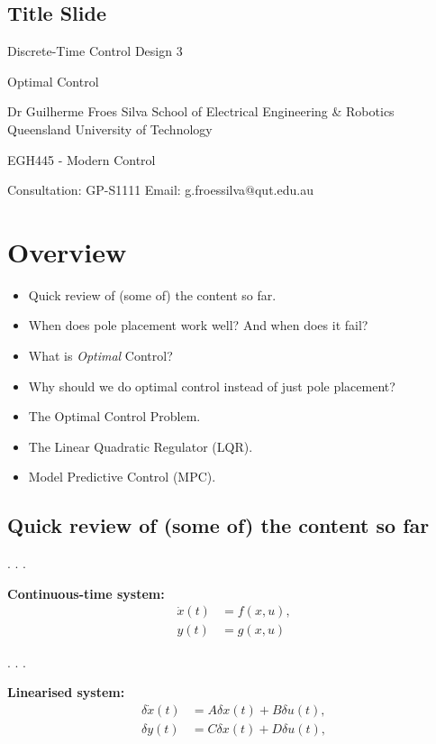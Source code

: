 \documentclass[
  letterpaper,
  DIV=11,
  numbers=noendperiod,
  oneside]{scrartcl}
\author{}
\date{}
\providecommand{\tightlist}{%
  \setlength{\itemsep}{0pt}\setlength{\parskip}{0pt}}
\begin{document}
\subsection{Title Slide}\label{title-slide}

Discrete-Time Control Design 3

Optimal Control

Dr Guilherme Froes Silva School of Electrical Engineering \& Robotics
Queensland University of Technology

EGH445 - Modern Control

Consultation: GP-S1111 Email: g.froessilva@qut.edu.au

\section{Overview}\label{overview}

\begin{itemize}
\tightlist
\item
  Quick review of (some of) the content so far.
\item
  When does pole placement work well? {And when does it fail?}
\item
  What is \emph{Optimal} Control?
\item
  Why should we do optimal control instead of just pole placement?
\item
  The Optimal Control Problem.
\item
  The Linear Quadratic Regulator (LQR).
\item
  Model Predictive Control (MPC).
\end{itemize}

\subsection{Quick review of (some of) the content so
far}\label{quick-review-of-some-of-the-content-so-far}

. . .

\textbf{Continuous-time system:} \[ 
\begin{align*}\dot{x}(t) &= f(x, u), \\ y(t) &= g(x, u) \end{align*} 
\]

. . .

\textbf{Linearised system:} \[ 
\begin{align*} 
\delta\dot{x}(t) &= A\delta x(t) + B \delta u(t),  \\ 
\delta y(t) &= C\delta x(t) + D\delta u(t),
\end{align*} 
\]
\end{document}
